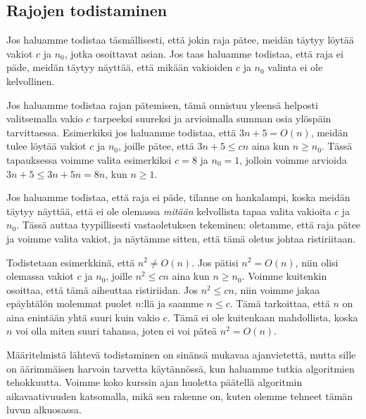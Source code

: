 \subsection{Rajojen todistaminen}

Jos haluamme todistaa täsmällisesti, että jokin raja pätee,
meidän täytyy löytää vakiot $c$ ja $n_0$, jotka osoittavat asian.
Jos taas haluamme todistaa, että raja ei päde,
meidän täytyy näyttää, että mikään vakioiden $c$ ja $n_0$ valinta ei ole kelvollinen.

Jos haluamme todistaa rajan pätemisen,
tämä onnistuu yleensä helposti valitsemalla vakio $c$
tarpeeksi suureksi ja arvioimalla summan osia ylöspäin tarvittaessa.
Esimerkiksi jos haluamme todistaa, että $3n+5 = O(n)$, meidän tulee löytää
vakiot $c$ ja $n_0$, joille pätee, että $3n+5 \le cn$ aina kun $n \ge n_0$.
Tässä tapauksessa voimme valita esimerkiksi $c=8$ ja $n_0=1$,
jolloin voimme arvioida $3n+5 \le 3n+5n=8n$, kun $n \ge 1$.

Jos haluamme todistaa, että raja ei päde, tilanne on hankalampi,
koska meidän täytyy näyttää, että ei ole olemassa \emph{mitään} kelvollista
tapaa valita vakioita $c$ ja $n_0$.
Tässä auttaa tyypillisesti vastaoletuksen tekeminen: oletamme,
että raja pätee ja voimme valita vakiot,
ja näytämme sitten, että tämä oletus johtaa ristiriitaan.

Todistetaan esimerkkinä, että $n^2 \neq O(n)$.
Jos pätisi $n^2=O(n)$, niin olisi olemassa vakiot $c$ ja $n_0$,
joille $n^2 \le cn$ aina kun $n \ge n_0$.
Voimme kuitenkin osoittaa, että tämä aiheuttaa ristiriidan.
Jos $n^2 \le cn$, niin voimme jakaa epäyhtälön molemmat puolet $n$:llä
ja saamme $n \le c$.
Tämä tarkoittaa, että $n$ on aina enintään yhtä suuri kuin vakio $c$.
Tämä ei ole kuitenkaan mahdollista, koska $n$ voi olla miten
suuri tahansa, joten ei voi päteä $n^2 = O(n)$.

Määritelmistä lähtevä todistaminen on sinänsä mukavaa ajanvietettä,
mutta sille on äärimmäisen harvoin tarvetta käytännössä,
kun haluamme tutkia algoritmien tehokkuutta.
Voimme koko kurssin ajan huoletta päätellä algoritmin aikavaativuuden
katsomalla, mikä sen rakenne on, kuten olemme tehneet tämän luvun alkuosassa.